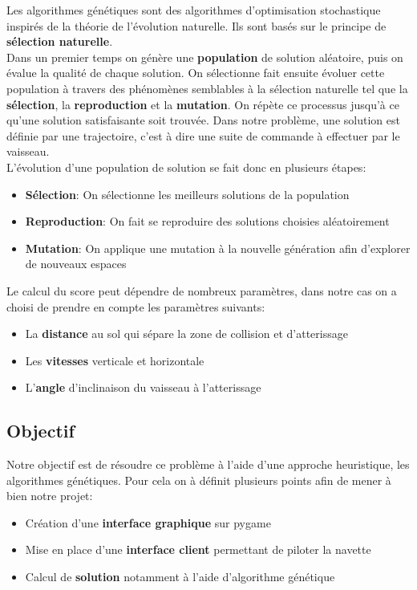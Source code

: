 \documentclass[french,a4paper,10pt,twocolumn]{article}
\begin{document}
Les algorithmes génétiques sont des algorithmes d'optimisation stochastique inspirés de la théorie de l'évolution naturelle.
Ils sont basés sur le principe de \textbf{sélection naturelle}.\\
Dans un premier temps on génère une \textbf{population} de solution aléatoire, puis on évalue la qualité de chaque solution.
On sélectionne fait ensuite évoluer cette population à travers des phénomènes semblables à la sélection naturelle tel que la \textbf{sélection}, la \textbf{reproduction} et la \textbf{mutation}.
On répète ce processus jusqu'à ce qu'une solution satisfaisante soit trouvée.
Dans notre problème, une solution est définie par une trajectoire, c'est à dire une suite de commande à effectuer par le vaisseau.\\
L'évolution d'une population de solution se fait donc en plusieurs étapes:
\begin{itemize}
    \item \textbf{Sélection}: On sélectionne les meilleurs solutions de la population
    \item \textbf{Reproduction}: On fait se reproduire des solutions choisies aléatoirement
    \item \textbf{Mutation}: On applique une mutation à la nouvelle génération afin d'explorer de nouveaux espaces
\end{itemize}
Le calcul du score peut dépendre de nombreux paramètres, dans notre cas on a choisi de prendre en compte les paramètres suivants:
\begin{itemize}
    \item La \textbf{distance} au sol qui sépare la zone de collision et d'atterissage
    \item Les \textbf{vitesses} verticale et horizontale 
    \item L'\textbf{angle} d'inclinaison du vaisseau à l'atterissage
\end{itemize}


\subsection{Objectif}

Notre objectif est de résoudre ce problème à l'aide d'une approche heuristique, les algorithmes génétiques. 
Pour cela on à définit plusieurs points afin de mener à bien notre projet: 
\begin{itemize}
    \item Création d'une \textbf{interface graphique} sur pygame
    \item Mise en place d'une \textbf{interface client} permettant de piloter la navette
    \item Calcul de \textbf{solution} notamment à l'aide d'algorithme génétique    
\end{itemize}
\end{document}
